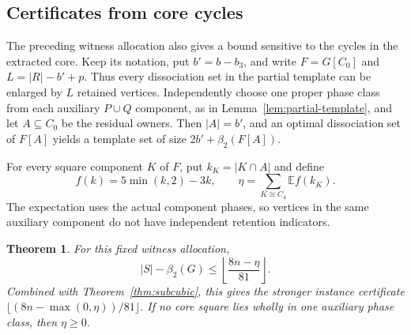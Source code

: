 \documentclass[11pt]{article}
\newtheorem{theorem}{Theorem}
\newcommand{\diss}{\beta_2}
\begin{document}
\subsection{Certificates from core cycles}

The preceding witness allocation also gives a bound sensitive to the
cycles in the extracted core. Keep its notation, put $b'=b-b_3$, and
write $F=G[C_0]$ and $L=|R|-b'+p$. Thus every dissociation set in the
partial template can be enlarged by $L$ retained vertices. Independently
choose one proper phase class from each auxiliary $P\cup Q$ component,
as in Lemma~\ref{lem:partial-template}, and let $A\subseteq C_0$ be the
residual owners. Then $|A|=b'$, and an optimal dissociation set of $F[A]$
yields a template set of size $2b'+\diss(F[A])$.

For every square component $K$ of $F$, put $k_K=|K\cap A|$ and define
\[
 f(k)=5\min(k,2)-3k,\qquad
 \eta=\sum_{K\cong C_4}\mathbb E f(k_K).
\]
The expectation uses the actual component phases, so vertices in the
same auxiliary component do not have independent retention indicators.

\begin{theorem}\label{thm:core-square}
For this fixed witness allocation,
\[
 |S|-\diss(G)\le\left\lfloor\frac{8n-\eta}{81}\right\rfloor.
\]
Combined with Theorem~\ref{thm:subcubic}, this gives the stronger
instance certificate $\lfloor(8n-\max(0,\eta))/81\rfloor$.
If no core square lies wholly in one auxiliary phase class, then
$\eta\ge0$.
\end{theorem}
\end{document}
